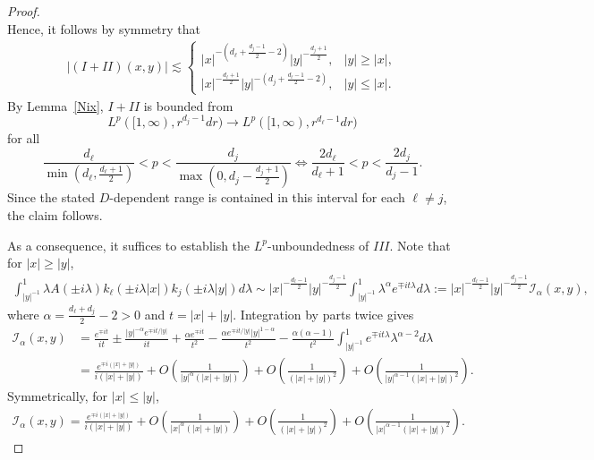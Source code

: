 \documentclass[12pt]{amsart}
\begin{document}
\begin{proof}
\begin{equation*}
\end{equation*}
Hence, it follows by symmetry that
\begin{align*}
    |(I+II)(x,y)|\lesssim \begin{cases}
        |x|^{-\left( d_\ell+\frac{d_j-1}{2}-2 \right)} |y|^{-\frac{d_j+1}{2}}, & |y|\ge |x|,\\
        |x|^{-\frac{d_\ell+1}{2}} |y|^{-\left( d_j + \frac{d_\ell-1}{2} -2 \right)}, & |y|\le |x|.
    \end{cases}
\end{align*}
By Lemma~\ref{Nix}, $I+II$ is bounded from 
\begin{equation*}
    L^p([1,\infty),r^{d_j-1}dr) \to L^p([1,\infty),r^{d_\ell-1}dr)
\end{equation*}
for all
\begin{equation}
    \frac{d_\ell}{\min \left( d_\ell, \frac{d_\ell+1}{2} \right)} < p < \frac{d_j}{\max\left( 0, d_j - \frac{d_j+1}{2} \right)} \iff \frac{2d_\ell}{d_\ell+1} < p < \frac{2d_j}{d_j-1}.
\end{equation}
Since the stated $D$-dependent range is contained in this interval for each $\ell\neq j$, the claim follows.

As a consequence, it suffices to establish the $L^p$-unboundedness of $III$. Note that for $|x|\ge |y|$,
\begin{align*}
    \int_{|y|^{-1}}^1  \lambda A(\pm i\lambda) k_\ell(\pm i\lambda|x|) k_j(\pm i\lambda|y|) d\lambda \sim |x|^{-\frac{d_\ell-1}{2}} |y|^{-\frac{d_j-1}{2}}\int_{|y|^{-1}}^1 \lambda^{\alpha} e^{\mp i t\lambda} d\lambda := |x|^{-\frac{d_\ell-1}{2}} |y|^{-\frac{d_j-1}{2}} \mathcal{I}_\alpha(x,y),
\end{align*}
where $\alpha = \frac{d_\ell+d_j}{2}-2>0$ and $t = |x|+|y|$. Integration by parts twice gives
\begin{align}\nonumber
    \mathcal{I}_\alpha(x,y) &= \frac{e^{\mp it}}{it} \pm \frac{|y|^{-\alpha} e^{\mp it/|y|}}{it} + \frac{\alpha e^{\mp it}}{t^2} - \frac{\alpha e^{\mp it/|y|} |y|^{1-\alpha}}{t^2}    - \frac{\alpha (\alpha-1)}{t^2} \int_{|y|^{-1}}^1 e^{\mp it \lambda}  \lambda^{\alpha-2} d\lambda \\ \label{I1}
    &= \frac{e^{\mp i(|x|+|y|)}}{i(|x|+|y|)} + O\left(\frac{1}{|y|^{\alpha}(|x|+|y|)}\right) + O\left(\frac{1}{(|x|+|y|)^2}\right) + O\left(\frac{1}{|y|^{\alpha-1}(|x|+|y|)^2}\right).
\end{align}
Symmetrically, for $|x|\le |y|$,
\begin{align}\label{I2}
    \mathcal{I}_\alpha(x,y)= \frac{e^{\mp i(|x|+|y|)}}{i(|x|+|y|)} + O\left(\frac{1}{|x|^{\alpha}(|x|+|y|)}\right) + O\left(\frac{1}{(|x|+|y|)^2}\right) + O\left(\frac{1}{|x|^{\alpha-1}(|x|+|y|)^2}\right).
\end{align}


\end{proof}
\end{document}
